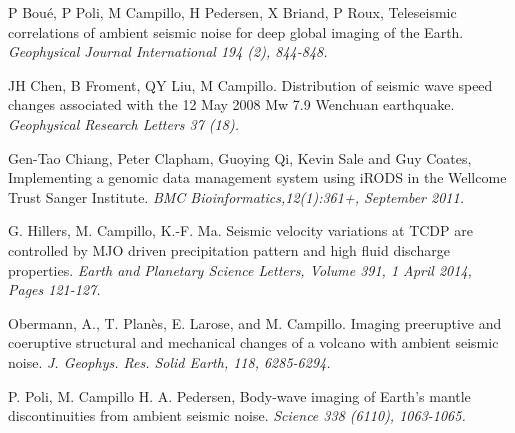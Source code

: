 \documentclass[a4paper, 10pt]{article}
\begin{document}
\begin{multicols}{2}
\begin{thebibliography}{9}

P Bou\'e, P Poli, M Campillo, H Pedersen, X Briand, P Roux,
Teleseismic correlations of ambient seismic noise for deep global imaging of the Earth.
{\em Geophysical Journal International 194 (2), 844-848.}

JH Chen, B Froment, QY Liu, M Campillo.
Distribution of seismic wave speed changes associated with the 12 May 2008 Mw 7.9 Wenchuan earthquake.
{\em Geophysical Research Letters 37 (18).}

 Gen-Tao Chiang, Peter Clapham, Guoying Qi, Kevin Sale and Guy Coates,
 Implementing a genomic data management system using iRODS in the Wellcome Trust Sanger Institute.
{\em BMC Bioinformatics,12(1):361+, September 2011.}

G. Hillers, M. Campillo, K.-F. Ma.
Seismic velocity variations at TCDP are controlled by MJO driven precipitation pattern and high fluid discharge properties.
{\em Earth and Planetary Science Letters, Volume 391, 1 April 2014, Pages 121-127.}

Obermann, A., T. Plan\`es, E. Larose, and M. Campillo.
Imaging preeruptive and coeruptive structural and mechanical changes of a volcano with ambient seismic noise.
{\em J. Geophys. Res. Solid Earth, 118, 6285-6294. }

P. Poli, M. Campillo H. A. Pedersen,
Body-wave imaging of Earth's mantle discontinuities from ambient seismic noise.
{\em Science 338 (6110), 1063-1065.}


\end{thebibliography}

\end{multicols}
\end{document}
